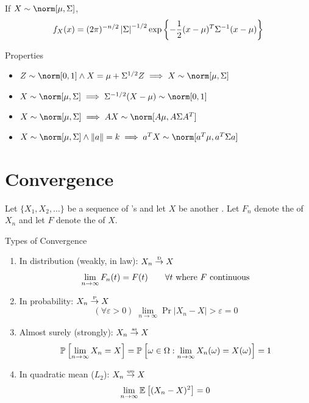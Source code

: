 \documentclass[landscape]{article}
\begin{document}
\begin{multicols*}{2}
If $X \dist \norm[\mu,\Sigma]$,
\[f_X(x) = (2\pi)^{-n/2} \left|\Sigma\right|^{-1/2}
\exp\left\{-\frac{1}{2}(x-\mu)^T\Sigma^{-1}(x-\mu)\right\} \]

Properties
\begin{itemize}
  \item $Z \dist \norm[0,1] \wedge X = \mu+\Sigma^{1/2}Z
    \imp X \dist \norm[\mu,\Sigma]$
  \item $X \dist \norm[\mu,\Sigma] \imp \Sigma^{-1/2}(X-\mu) \dist \norm[0,1]$
  \item $X \dist \norm[\mu,\Sigma] \imp AX \dist \norm[A\mu, A\Sigma A^T]$
  \item $X \dist \norm[\mu,\Sigma] \wedge \|a\| = k
    \imp a^TX \dist \norm[a^T\mu, a^T\Sigma a]$
\end{itemize}

\section{Convergence}

Let $\{X_1,X_2,\ldots\}$ be a sequence of \rv's and let $X$ be another \rv.
Let $F_n$ denote the \cdf of $X_n$ and let $F$ denote the \cdf of $X$.

Types of Convergence
\begin{enumerate}
  \item In distribution (weakly, in law): $X_n \stackrel{\text{\tiny{D}}}{\rightarrow} X$
    \[\lim_{n\to \infty} F_n(t) = F(t) \qquad
      \forall t \text{ where } F \text{ continuous}\]
  \item In probability: $X_n \stackrel{\text{\tiny{P}}}{\rightarrow} X$
    \[(\forall \varepsilon > 0) \;
    \lim_{n\to\infty} \Pr{|X_n -X| > \varepsilon} = 0\]
  \item Almost surely (strongly): $X_n \stackrel{\text{\tiny{as}}}{\rightarrow} X$
    \[\mathbb{P}_{}\left[\lim_{n\to \infty} X_n=X\right] = \mathbb{P}_{}\left[\omega\in\Omega: \lim_{n\to \infty} X_n(\omega)=X(\omega)\right]=1\]
  \item In quadratic mean ($L_2$): $X_n \stackrel{\text{\tiny{qm}}}{\rightarrow} X$
    \[\lim_{n\to\infty} \mathbb{E}_{}\left[(X_n - X)^2\right] = 0\]
\end{enumerate}


\end{multicols*}
\end{document}
